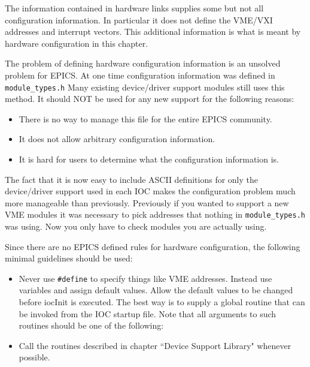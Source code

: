 The information contained in hardware links supplies some but not all configuration information. In particular it does not 
define the VME/VXI addresses and interrupt vectors. This additional information is what is meant by hardware 
configuration in this chapter.

The problem of defining hardware configuration information is an unsolved problem for EPICS. At one time 
configuration information was defined in \verb|module_types.h| Many existing device/driver support modules still uses this 
method. It should NOT be used for any new support for the following reasons:

\begin{itemize}
\item There is no way to manage this file for the entire EPICS community.

\item It does not allow arbitrary configuration information.

\item It is hard for users to determine what the configuration information is.

\end{itemize}

The fact that it is now easy to include ASCII definitions for only the device/driver support used in each IOC makes the 
configuration problem much more manageable than previously. Previously if you wanted to support a new VME modules 
it was necessary to pick addresses that nothing in \verb|module_types.h| was using. Now you only have to check modules 
you are actually using.

Since there are no EPICS defined rules for hardware configuration, the following minimal guidelines should be used:

\begin{itemize}

\item Never use \verb|#define| to specify things like VME addresses. Instead use variables and assign default values. Allow 
the default values to be changed before iocInit is executed. The best way is to supply a global routine that can be 
invoked from the IOC startup file. Note that all arguments to such routines should be one of the following:


\item Call the routines described in chapter ``Device Support Library" whenever possible.

\end{itemize}






